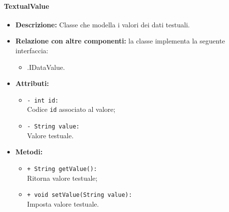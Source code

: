 \paragraph{TextualValue}
\label{bottextualvalue}
\begin{flushleft}
\begin{itemize}
\item \textbf{Descrizione:} Classe che modella i valori dei dati testuali.
\item \textbf{Relazione con altre componenti:} la classe implementa la seguente interfaccia:
		\begin{itemize}
			\item \smodel{}.IDataValue.
		\end{itemize}
\item \textbf{Attributi:}
\begin{sloppypar}
\begin{itemize}
\item \texttt{- int id:}\\ Codice \texttt{id} associato al valore;
\item \texttt{- String value:}\\ Valore testuale.
\end{itemize}
\end{sloppypar}
\item \textbf{Metodi:}
\begin{sloppypar}
\begin{itemize}
\item \texttt{+ String getValue():}\\ Ritorna valore testuale;
\item \texttt{+ void setValue(String value):}\\ Imposta valore testuale.
\end{itemize}
\end{sloppypar}
\end{itemize}
\end{flushleft}

